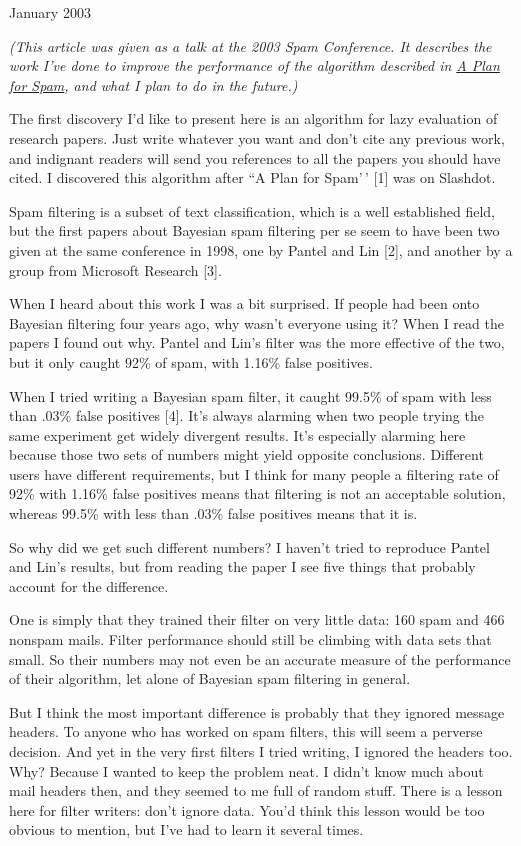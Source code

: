 January 2003

\emph{(This article was given as a talk at the 2003 Spam Conference. It
describes the work I've done to improve the performance of the algorithm
described in \href{spam.html}{A Plan for Spam}, and what I plan to do in
the future.)}

The first discovery I'd like to present here is an algorithm for lazy
evaluation of research papers. Just write whatever you want and don't
cite any previous work, and indignant readers will send you references
to all the papers you should have cited. I discovered this algorithm
after ``A Plan for Spam'\,' {[}1{]} was on Slashdot.

Spam filtering is a subset of text classification, which is a well
established field, but the first papers about Bayesian spam filtering
per se seem to have been two given at the same conference in 1998, one
by Pantel and Lin {[}2{]}, and another by a group from Microsoft
Research {[}3{]}.

When I heard about this work I was a bit surprised. If people had been
onto Bayesian filtering four years ago, why wasn't everyone using it?
When I read the papers I found out why. Pantel and Lin's filter was the
more effective of the two, but it only caught 92\% of spam, with 1.16\%
false positives.

When I tried writing a Bayesian spam filter, it caught 99.5\% of spam
with less than .03\% false positives {[}4{]}. It's always alarming when
two people trying the same experiment get widely divergent results. It's
especially alarming here because those two sets of numbers might yield
opposite conclusions. Different users have different requirements, but I
think for many people a filtering rate of 92\% with 1.16\% false
positives means that filtering is not an acceptable solution, whereas
99.5\% with less than .03\% false positives means that it is.

So why did we get such different numbers? I haven't tried to reproduce
Pantel and Lin's results, but from reading the paper I see five things
that probably account for the difference.

One is simply that they trained their filter on very little data: 160
spam and 466 nonspam mails. Filter performance should still be climbing
with data sets that small. So their numbers may not even be an accurate
measure of the performance of their algorithm, let alone of Bayesian
spam filtering in general.

But I think the most important difference is probably that they ignored
message headers. To anyone who has worked on spam filters, this will
seem a perverse decision. And yet in the very first filters I tried
writing, I ignored the headers too. Why? Because I wanted to keep the
problem neat. I didn't know much about mail headers then, and they
seemed to me full of random stuff. There is a lesson here for filter
writers: don't ignore data. You'd think this lesson would be too obvious
to mention, but I've had to learn it several times.

